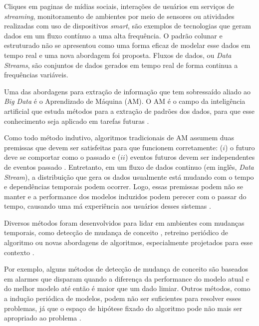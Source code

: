 Cliques em paginas de mídias sociais, interações de usuários em serviços de
\textit{streaming}, monitoramento de ambientes por meio de sensores ou
atividades realizadas com uso de dispositivos \textit{smart}, são exemplos de
tecnologias que geram dados em um fluxo contínuo a uma alta frequência. O
padrão colunar e estruturado não se apresentou como uma forma eficaz de modelar
esse dados em tempo real \cite{gama2007learning} e uma nova abordagem foi
proposta. Fluxos de dados, ou \textit{Data Streams}, são conjuntos de dados
gerados em tempo real de forma continua a frequências variáveis.



Uma das abordagens para extração de informação que tem sobressaído aliado ao
\textit{Big Data} é o Aprendizado de Máquina (AM). O AM é o campo da
inteligência artificial que estuda métodos para a extração de padrões dos
dados, para que esse conhecimento seja aplicado em tarefas futuras
\cite{mitchell1997machine,friedman2001elements}.

Como todo método indutivo, algoritmos tradicionais de AM assumem duas premissas
que devem ser satisfeitas para que funcionem corretamente: ($i$) o futuro deve
se comportar como o passado e ($ii$) eventos futuros devem ser independentes de
eventos passado \cite{vapnik2013nature}. Entretanto, em um fluxo de dados
continuo (em inglês, \textit{Data Stream}), a distribuição que gera os dados
usualmente está mudando com o tempo e dependências temporais podem ocorrer.
Logo, essas premissas podem não se manter e a performance dos modelos induzidos
podem perecer com o passar do tempo, causando uma má experiência aos usuários
desses sistemas  \cite{gama2007learning, Johansson2014}.

Diversos métodos foram desenvolvidos para lidar em ambientes com mudanças
temporais, como detecção de mudança de conceito
\cite{klinkenberg2000detecting}, retreino periódico de algoritmo
\cite{bifet2007learning} ou novas abordagens de algoritmos, especialmente
projetados para esse contexto \cite{zang2014comparative}.

Por exemplo, alguns métodos de detecção de mudança de conceito
\cite{gama2010knowledge} são baseados em alarmes que disparam quando a
diferença da performance do modelo atual e do melhor modelo até então é maior
que um dado limiar. Outros métodos, como a indução periódica de modelos, podem
não ser suficientes para resolver esses problemas, já que o espaço de hipótese
fixado do algoritmo pode não mais ser apropriado ao problema
\cite{rossi2014metastream}.

